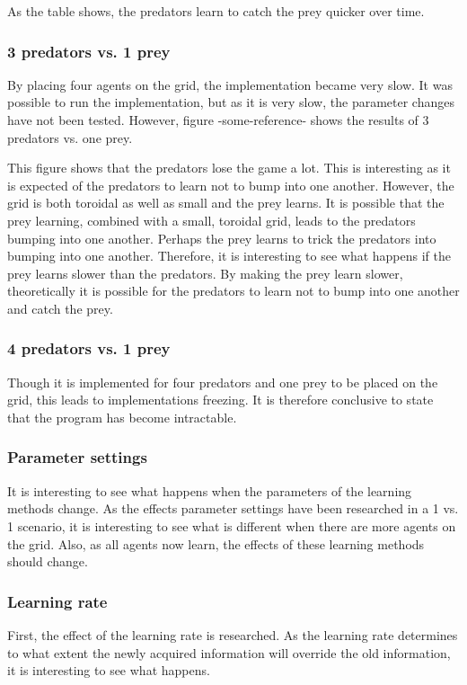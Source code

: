 As the table shows, the predators learn to catch the prey quicker over time.

\subsubsection{3 predators vs. 1 prey}
By placing four agents on the grid, the implementation became very slow. It was possible to run the implementation, but as it is very slow, the parameter changes have not been tested. However, figure -some-reference- shows the results of 3 predators vs. one prey.

This figure shows that the predators lose the game a lot. This is interesting as it is expected of the predators to learn not to bump into one another. However, the grid is both toroidal as well as small and the prey learns. It is possible that the prey learning, combined with a small, toroidal grid, leads to the predators bumping into one another. Perhaps the prey learns to trick the predators into bumping into one another. Therefore, it is interesting to see what happens if the prey learns slower than the predators. By making the prey learn slower, theoretically it is possible for the predators to learn not to bump into one another and catch the prey. 

\subsubsection{4 predators vs. 1 prey}
Though it is implemented for four predators and one prey to be placed on the grid, this leads to implementations freezing. It is therefore conclusive to state that the program has become intractable. 

\subsubsection{Parameter settings}
It is interesting to see what happens when the parameters of the learning methods change. As the effects parameter settings have been researched in a 1 vs. 1 scenario, it is interesting to see what is different when there are more agents on the grid. Also, as all agents now learn, the effects of these learning methods should change.

\subsubsection{Learning rate}
First, the effect of the learning rate is researched. As the learning rate determines to what extent the newly acquired information will override the old information, it is interesting to see what happens.

